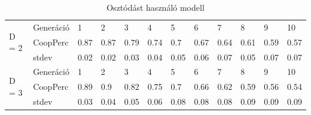 \begin{frame}
\begin{table}[htb]
	\caption{Osztódást használó modell}
	\label{table:osztodik}
	\begin{tabular}{ | l | l | l | l | l | l | l | l | l | l | l | l | }
		\hline
		\multirow{3}{*}{D = 2}
		& Generáció & 1 & 2 & 3 & 4 & 5 & 6 & 7 & 8 & 9 & 10 \\ \cline{2-12}
		& CoopPerc & 0.87 & 0.87 & 0.79 & 0.74 & 0.7 & 0.67 & 0.64 & 0.61 & 0.59 & 0.57 \\ \cline{2-12}
		& stdev & 0.02 & 0.02 & 0.03 & 0.04 & 0.05 & 0.06 & 0.07 & 0.05 & 0.07 & 0.07 \\ \hline
		\multirow{3}{*}{D = 3}
		& Generáció & 1 & 2 & 3 & 4 & 5 & 6 & 7 & 8 & 9 & 10 \\ \cline{2-12}
		& CoopPerc & 0.89 & 0.9 & 0.82 & 0.75 & 0.7 & 0.66 & 0.62 & 0.59 & 0.56 & 0.54 \\ \cline{2-12}
		& stdev & 0.03 & 0.04 & 0.05 & 0.06 & 0.08 & 0.08 & 0.08 & 0.09 & 0.09 & 0.09 \\ \hline
	\end{tabular}
\end{table}
\end{frame}

